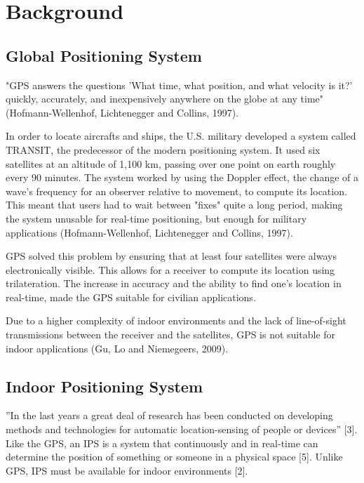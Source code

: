\chapter{Background}

\section{Global Positioning System}
"GPS answers the questions 'What time, what position, and what velocity is it?' quickly, accurately, and inexpensively anywhere on the globe at any time" (Hofmann-Wellenhof, Lichtenegger and Collins, 1997).  

In order to locate aircrafts and ships, the U.S. military developed a system called TRANSIT, the predecessor of the modern positioning system. It used six satellites at an altitude of 1,100 km, passing over one point on earth roughly every 90 minutes. The system worked by using the Doppler effect, the change of a wave's frequency for an observer relative to movement, to compute its location. This meant that users had to wait between "fixes" quite a long period, making the system unusable for real-time positioning, but enough for military applications (Hofmann-Wellenhof, Lichtenegger and Collins, 1997). 

GPS solved this problem by ensuring that at least four satellites were always electronically visible. This allows for a receiver to compute its location using trilateration. The increase in accuracy and the ability to find one’s location in real-time, made the GPS suitable for civilian applications. 

Due to a higher complexity of indoor environments and the lack of line-of-sight transmissions between the receiver and the satellites, GPS is not suitable for indoor applications (Gu, Lo and Niemegeers, 2009).

\section{Indoor Positioning System}
”In the last years a great deal of research has been conducted on developing methods and technologies for automatic location-sensing of people or devices” [3]. Like the GPS, an IPS is a system that continuously and in real-time can determine the position of something or someone in a physical space [5]. Unlike GPS, IPS must be available for indoor environments [2]. 

